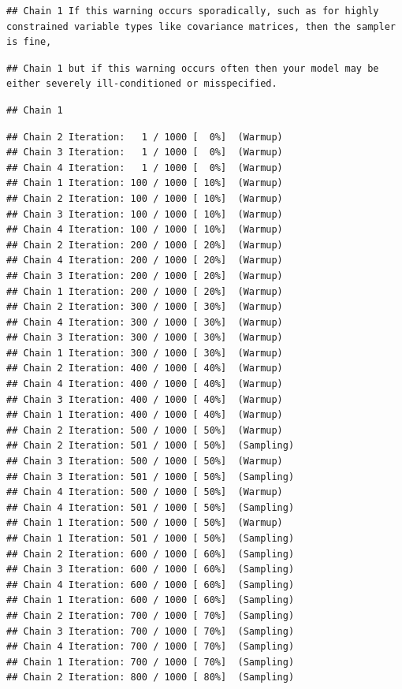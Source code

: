 \documentclass[
]{book}
\begin{document}
\begin{verbatim}
## Chain 1 If this warning occurs sporadically, such as for highly constrained variable types like covariance matrices, then the sampler is fine,
\end{verbatim}

\begin{verbatim}
## Chain 1 but if this warning occurs often then your model may be either severely ill-conditioned or misspecified.
\end{verbatim}

\begin{verbatim}
## Chain 1
\end{verbatim}

\begin{verbatim}
## Chain 2 Iteration:   1 / 1000 [  0%]  (Warmup) 
## Chain 3 Iteration:   1 / 1000 [  0%]  (Warmup) 
## Chain 4 Iteration:   1 / 1000 [  0%]  (Warmup) 
## Chain 1 Iteration: 100 / 1000 [ 10%]  (Warmup) 
## Chain 2 Iteration: 100 / 1000 [ 10%]  (Warmup) 
## Chain 3 Iteration: 100 / 1000 [ 10%]  (Warmup) 
## Chain 4 Iteration: 100 / 1000 [ 10%]  (Warmup) 
## Chain 2 Iteration: 200 / 1000 [ 20%]  (Warmup) 
## Chain 4 Iteration: 200 / 1000 [ 20%]  (Warmup) 
## Chain 3 Iteration: 200 / 1000 [ 20%]  (Warmup) 
## Chain 1 Iteration: 200 / 1000 [ 20%]  (Warmup) 
## Chain 2 Iteration: 300 / 1000 [ 30%]  (Warmup) 
## Chain 4 Iteration: 300 / 1000 [ 30%]  (Warmup) 
## Chain 3 Iteration: 300 / 1000 [ 30%]  (Warmup) 
## Chain 1 Iteration: 300 / 1000 [ 30%]  (Warmup) 
## Chain 2 Iteration: 400 / 1000 [ 40%]  (Warmup) 
## Chain 4 Iteration: 400 / 1000 [ 40%]  (Warmup) 
## Chain 3 Iteration: 400 / 1000 [ 40%]  (Warmup) 
## Chain 1 Iteration: 400 / 1000 [ 40%]  (Warmup) 
## Chain 2 Iteration: 500 / 1000 [ 50%]  (Warmup) 
## Chain 2 Iteration: 501 / 1000 [ 50%]  (Sampling) 
## Chain 3 Iteration: 500 / 1000 [ 50%]  (Warmup) 
## Chain 3 Iteration: 501 / 1000 [ 50%]  (Sampling) 
## Chain 4 Iteration: 500 / 1000 [ 50%]  (Warmup) 
## Chain 4 Iteration: 501 / 1000 [ 50%]  (Sampling) 
## Chain 1 Iteration: 500 / 1000 [ 50%]  (Warmup) 
## Chain 1 Iteration: 501 / 1000 [ 50%]  (Sampling) 
## Chain 2 Iteration: 600 / 1000 [ 60%]  (Sampling) 
## Chain 3 Iteration: 600 / 1000 [ 60%]  (Sampling) 
## Chain 4 Iteration: 600 / 1000 [ 60%]  (Sampling) 
## Chain 1 Iteration: 600 / 1000 [ 60%]  (Sampling) 
## Chain 2 Iteration: 700 / 1000 [ 70%]  (Sampling) 
## Chain 3 Iteration: 700 / 1000 [ 70%]  (Sampling) 
## Chain 4 Iteration: 700 / 1000 [ 70%]  (Sampling) 
## Chain 1 Iteration: 700 / 1000 [ 70%]  (Sampling) 
## Chain 2 Iteration: 800 / 1000 [ 80%]  (Sampling) 

\end{verbatim}
\end{document}
